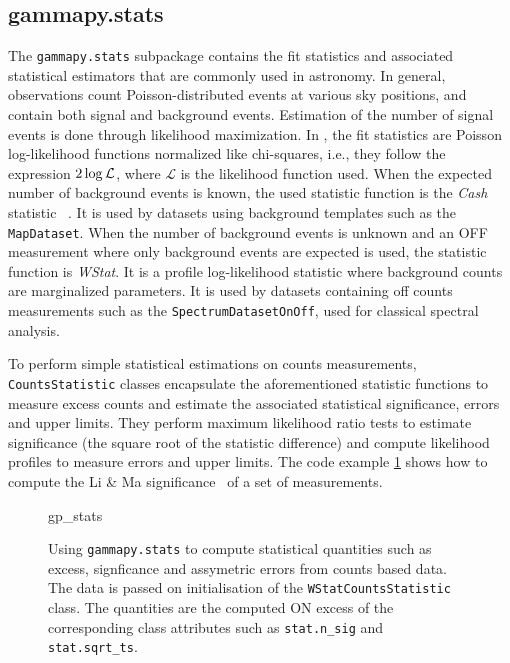 \documentclass[traditabstract, longauth]{aa}
\newcommand{\code}[1]{\texttt{#1}}
\begin{document}
\subsection{gammapy.stats}
\label{ssec:gammapy-stats}
The \code{gammapy.stats} subpackage contains the fit statistics and associated
statistical estimators that are commonly used in \gammaray astronomy. In
general, \gammaray observations count Poisson-distributed events at various sky
positions, and contain both signal and background events. Estimation of the
number of signal events is done through likelihood maximization. In \gammapy,
the fit statistics are Poisson log-likelihood functions normalized like
chi-squares, i.e., they follow the expression $2 \time\cdot \log{\mathcal{L}}$,
where $\mathcal{L}$ is
the likelihood function used. When the expected number of background events is known, the used statistic function 
 is the \emph{Cash} statistic
~\citep{Cash}. It is used by datasets using background templates such as the
\code{MapDataset}. When the number of background events is unknown and an OFF
measurement where only background events are expected is used, the statistic
function is \emph{WStat}. It is a profile log-likelihood statistic where background
counts are marginalized parameters. It is used by datasets containing off
counts measurements such as the \code{SpectrumDatasetOnOff}, used for classical
spectral analysis.

To perform simple statistical estimations on counts measurements,
\code{CountsStatistic} classes encapsulate the aforementioned statistic functions to
measure excess counts and estimate the associated statistical significance,
errors and upper limits. They perform maximum likelihood ratio tests to
estimate significance (the square root of the statistic difference) and compute
likelihood profiles to measure errors and upper limits. The code example
\ref{codeexample:stats} shows how to compute the Li \& Ma
significance~\citep{LiMa} of a set of measurements.

\begin{figure}
	\small
	{gp_stats}
	\caption{
        Using \code{gammapy.stats} to compute statistical quantities
        such as excess, signficance and assymetric errors
        from counts based data. The data is passed on initialisation
        of the \code{WStatCountsStatistic} class. The quantities
        are the computed ON excess of the corresponding class
        attributes such as \code{stat.n\_sig} and \code{stat.sqrt\_ts}.
    }
	\label{codeexample:stats} \end{figure}
\end{document}
